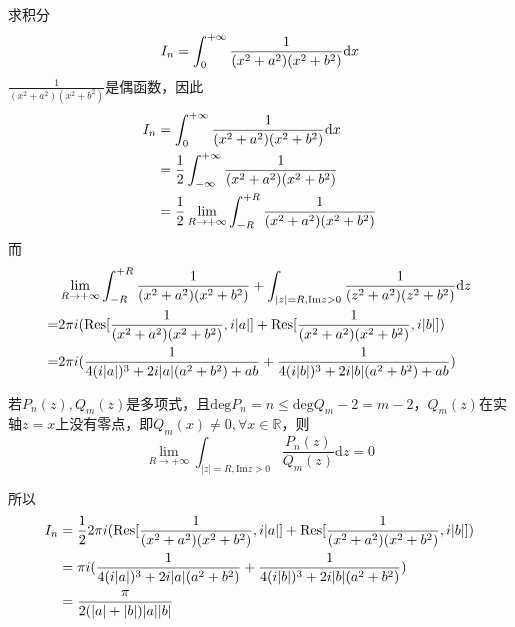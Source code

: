 \begin{homeworkProblem}
    求积分
    \[I_n=\int_0^{+\infty}\frac{1}{(x^2+a^2)(x^2+b^2)}\mathrm{d}x\]
\solution
$\frac{1}{(x^2+a^2)(x^2+b^2)}$是偶函数，因此
\[\begin{split}
I_n&=\int_0^{+\infty}\frac{1}{(x^2+a^2)(x^2+b^2)}\mathrm{d}x\\
&=\frac{1}{2}\int_{-\infty}^{+\infty}\frac{1}{(x^2+a^2)(x^2+b^2)}\\
&=\frac{1}{2}\lim_{R \rightarrow +\infty}\int_{-R}^{+R}\frac{1}{(x^2+a^2)(x^2+b^2)}
\end{split}\]
而
\[\begin{split}
&\lim_{R \rightarrow +\infty}\int_{-R}^{+R}\frac{1}{(x^2+a^2)(x^2+b^2)}
+ \int_{|z|=R, \mathrm{Im}z>0}\frac{1}{(z^2+a^2)(z^2+b^2)}\mathrm{d}z\\
=& 2\pi i(\mathrm{Res}[\frac{1}{(x^2+a^2)(x^2+b^2)}, i|a|] + \mathrm{Res}[\frac{1}{(x^2+a^2)(x^2+b^2)}, i|b|])\\
=& 2\pi i(\frac{1}{4(i|a|)^3+2i|a|(a^2+b^2)+ab}+\frac{1}{4(i|b|)^3+2i|b|(a^2+b^2)+ab})
\end{split}\]
\begin{theorem*}
    若$P_n(z),Q_m(z)$是多项式，且$\mathrm{deg}P_n = n \leq \mathrm{deg}Q_m-2=m-2$，$Q_m(z)$在实轴$z=x$上没有零点，即$Q_m(x)\neq0,\forall x\in\mathbb{R}$，则\[\lim_{R \rightarrow +\infty}\int_{|z|=R, \mathrm{Im}z>0}\frac{P_n(z)}{Q_m(z)}\mathrm{d}z=0\]
\end{theorem*}
所以
\[\begin{split}
I_n &= \frac{1}{2}2\pi i(\mathrm{Res}[\frac{1}{(x^2+a^2)(x^2+b^2)}, i|a|] + \mathrm{Res}[\frac{1}{(x^2+a^2)(x^2+b^2)}, i|b|])\\
&=\pi i(\frac{1}{4(i|a|)^3+2i|a|(a^2+b^2)}+\frac{1}{4(i|b|)^3+2i|b|(a^2+b^2)})\\
&= \frac{\pi}{2(|a|+|b|)|a||b|}
\end{split}\]
\end{homeworkProblem}

